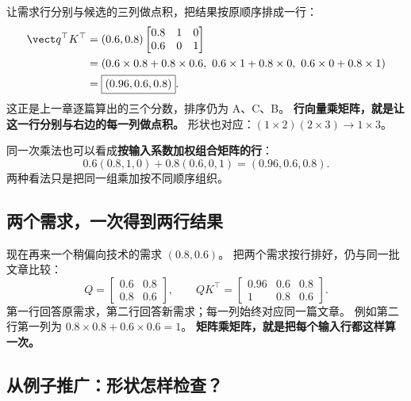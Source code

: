 让需求行分别与候选的三列做点积，把结果按原顺序排成一行：
\begin{equation}
\begin{aligned}
\vect q^\top K^\top
&=(0.6,0.8)\begin{bmatrix}0.8&1&0\\0.6&0&1\end{bmatrix}\\
&=(0.6\times0.8+0.8\times0.6,\ 0.6\times1+0.8\times0,\ 0.6\times0+0.8\times1)\\
&=\boxed{(0.96,0.6,0.8)}.
\end{aligned}
\end{equation}
这正是上一章逐篇算出的三个分数，排序仍为 A、C、B。
\textbf{行向量乘矩阵，就是让这一行分别与右边的每一列做点积。}
形状也对应：$(1\times2)(2\times3)\to1\times3$。

同一次乘法也可以看成\textbf{按输入系数加权组合矩阵的行}：
\[
0.6(0.8,1,0)+0.8(0.6,0,1)=(0.96,0.6,0.8).
\]
两种看法只是把同一组乘加按不同顺序组织。

\subsection{两个需求，一次得到两行结果}
\label{sec:matrix-article-batch}

现在再来一个稍偏向技术的需求 $(0.8,0.6)$。
把两个需求按行排好，仍与同一批文章比较：
\[
Q=\begin{bmatrix}0.6&0.8\\0.8&0.6\end{bmatrix},\qquad
QK^\top=\boxed{\begin{bmatrix}0.96&0.6&0.8\\1&0.8&0.6\end{bmatrix}}.
\]
第一行回答原需求，第二行回答新需求；每一列始终对应同一篇文章。
例如第二行第一列为 $0.8\times0.8+0.6\times0.6=1$。
\textbf{矩阵乘矩阵，就是把每个输入行都这样算一次。}



\subsection{从例子推广：形状怎样检查？}

